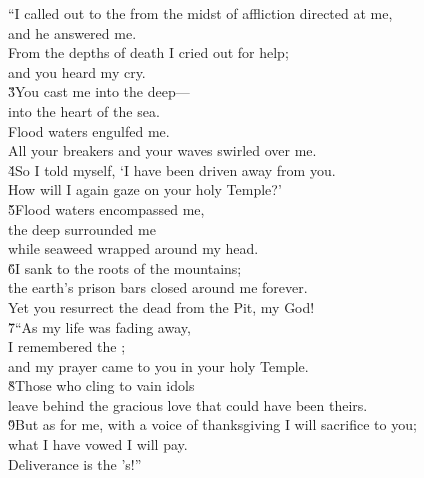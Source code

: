 \begin{poetry}
\poeml ``I called out to the  from the midst of affliction directed at me, \\
\poemll    and he answered me. \\
\poeml From the depths of death I cried out for help; \\
\poemll    and you heard my cry. \\
\poeml \v{3}You cast me into the deep--- \\
\poemll    into the heart of the sea. \\
\poeml Flood waters engulfed me. \\
\poemll    All your breakers and your waves swirled over me. \\
\poeml \v{4}So I told myself, `I have been driven away from you. \\
\poemll    How will I again gaze on your holy Temple?' \\
\poeml \v{5}Flood waters encompassed me, \\
\poemll    the deep surrounded me \\
\poemlll       while seaweed wrapped around my head. \\
\poeml \v{6}I sank to the roots of the mountains; \\
\poemll    the earth's prison bars closed around me forever. \\
\poemlll       Yet you resurrect the dead from the Pit,  my God! \\
\poeml \v{7}``As my life was fading away, \\
\poemll    I remembered the ; \\
\poemlll       and my prayer came to you in your holy Temple. \\
\poeml \v{8}Those who cling to vain idols \\
\poemll    leave behind the gracious love that could have been theirs. \\
\poeml \v{9}But as for me, with a voice of thanksgiving I will sacrifice to you; \\
\poemll    what I have vowed I will pay. \\
\poeml Deliverance is the 's!''
\end{poetry}


